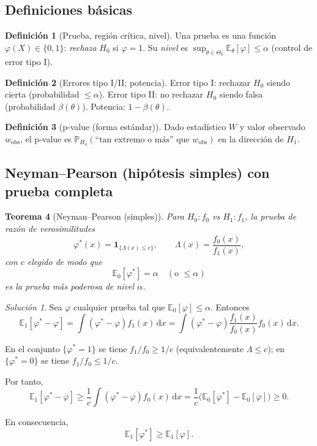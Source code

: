\documentclass[11pt]{article}
\theoremstyle{plain}
\newtheorem{theorem}{Teorema}[section]
\theoremstyle{definition}
\newtheorem{definition}[theorem]{Definición}
\theoremstyle{remark}
\theoremstyle{solstyle}
\newtheorem*{solution}{Solución}
\newcommand{\E}{\mathbb{E}}
\newcommand{\Pbb}{\mathbb{P}}
\newcommand{\1}{\mathbbm{1}}
\begin{document}
\subsection{Definiciones básicas}

\begin{definition}[Prueba, región crítica, nivel]
Una prueba es una función $\varphi(X)\in\{0,1\}$: \emph{rechaza} $H_0$ si $\varphi=1$.
Su \emph{nivel} es $\sup_{\theta\in\Theta_0}\E_\theta[\varphi]\le \alpha$ (control de error tipo I).
\end{definition}

\begin{definition}[Errores tipo I/II; potencia]
Error tipo I: rechazar $H_0$ siendo cierta (probabilidad $\le\alpha$).
Error tipo II: no rechazar $H_0$ siendo falsa (probabilidad $\beta(\theta)$).
Potencia: $1-\beta(\theta)$.
\end{definition}

\begin{definition}[p-value (forma estándar)]
Dado estadístico $W$ y valor observado $w_{\text{obs}}$, el p-value es
$\Pbb_{H_0}(\text{``tan extremo o más'' que }w_{\text{obs}})$ en la dirección de $H_1$.
\end{definition}

\subsection{Neyman--Pearson (hipótesis simples) con prueba completa}

\begin{theorem}[Neyman--Pearson (simples)]\label{thm:NP}
Para $H_0:f_0$ vs $H_1:f_1$, la prueba de razón de verosimilitudes
\[
\varphi^{*}(x)
=
\mathbf{1}_{\{\Lambda(x)\le c\}},
\qquad
\Lambda(x)=\frac{f_0(x)}{f_1(x)},
\]
con $c$ elegido de modo que 
\[
\mathbb{E}_0[\varphi^{*}] = \alpha
\quad (\text{o } \le \alpha)
\]
es la prueba más poderosa de nivel $\alpha$.
\end{theorem}

\begin{solution}
Sea $\varphi$ cualquier prueba tal que $\mathbb{E}_0[\varphi]\le\alpha$.
Entonces
\[
\mathbb{E}_1[\varphi^{*}-\varphi]
=
\int (\varphi^{*}-\varphi) f_1(x)\, \mathrm{d}x
=
\int (\varphi^{*}-\varphi)\frac{f_1(x)}{f_0(x)} f_0(x)\, \mathrm{d}x .
\]

En el conjunto $\{\varphi^{*}=1\}$ se tiene $f_1/f_0\ge 1/c$ 
(equivalentemente $\Lambda\le c$);  
en $\{\varphi^{*}=0\}$ se tiene $f_1/f_0\le 1/c$.

Por tanto,
\[
\mathbb{E}_1[\varphi^{*}-\varphi]
\ge
\frac{1}{c}
\int (\varphi^{*}-\varphi) f_0(x)\, \mathrm{d}x
=
\frac{1}{c}
\bigl(
\mathbb{E}_0[\varphi^{*}]
-
\mathbb{E}_0[\varphi]
\bigr)
\ge 0 .
\]

En consecuencia,
\[
\mathbb{E}_1[\varphi^{*}]
\ge
\mathbb{E}_1[\varphi].
\]
\end{solution}
\end{document}
